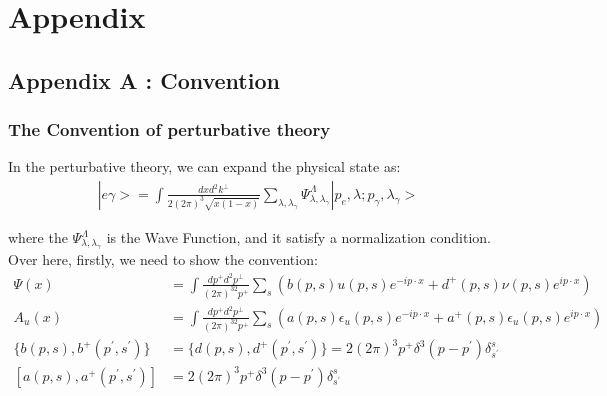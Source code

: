 \documentclass[a4paper,12pt]{article}
\begin{document}
\section{Appendix}
\subsection{Appendix A : Convention }

\subsubsection{The Convention of perturbative theory}

In the perturbative theory, we can expand the physical state as:
\begin{eqnarray}
|e\gamma> = \int \frac{dx d^2k^{\perp}}{2(2\pi)^3\sqrt{x(1-x)}} \sum_{\lambda,\lambda_{\gamma}} \Psi^{\Lambda}_{\lambda,\lambda_{\gamma}} |p_e,\lambda;p_{\gamma},\lambda_{\gamma}>\
\end{eqnarray}

where the $\Psi^{\Lambda}_{\lambda,\lambda_{\gamma}}$ is the Wave Function, and it satisfy a normalization condition. Over here, firstly, we need to show the convention:
\begin{align}
\Psi(x) &= \int \frac{dp^+d^2p^{\perp}}{(2\pi)^32p^+} \sum_s (b(p,s)u(p,s) e^{-ip\cdot x} + d^+(p,s) \nu (p,s)e^{ip\cdot x})\\
A_u(x) &= \int \frac{dp^+d^2p^{\perp}}{(2\pi)^32p^+} \sum_s (a(p,s) \epsilon_u(p,s) e^{-ip\cdot x} + a^+(p,s) \epsilon_u(p,s) e^{ip\cdot x})\\
\{b(p,s),b^+(p^{\prime},s^{\prime})\} &= \{d(p,s),d^+(p^{\prime},s^{\prime})\} = 2(2\pi)^3 p^+ \delta^3(p-p^{\prime})\delta^{s}_{s^{\prime}}\\
[a(p,s),a^+(p^{\prime},s^{\prime}) ] &= 2(2\pi)^3 p^+ \delta^3(p-p^{\prime})\delta^{s}_{s^{\prime}}
\end{align}
\end{document}
